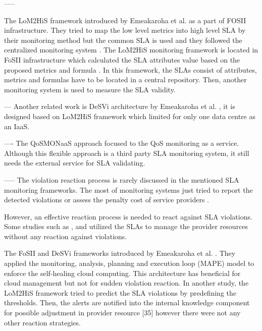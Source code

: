 -----


The LoM2HiS framework introduced by Emeakaroha et al. \cite{ [emeakaroha2010low] } as a part of FOSII \cite{fosii} infrastructure. They tried to map the low level metrics into high level SLA by their monitoring method but the common SLA is used and they followed the centralized monitoring system \cite{articleEmeakaroha2013}. The LoM2HiS monitoring framework is located in FoSII infrastructure which calculated the SLA attributes value based on the proposed metrics and formula \cite{articleEmeakaroha2013}. In this framework, the SLAs consist of attributes, metrics and formulas have to be located in a central repository.  Then, another monitoring system is used to measure the SLA validity. 

---
Another related work is DeSVi architecture by Emeakaroha et al. \cite{EMEAKAROHA20121017}, it is designed based on LoM2HiS \cite{5547150} framework which limited for only one data centre as an IaaS. 

----
The QoSMONaaS approach \cite{articleQoSMONaas} focused to the QoS monitoring as a service. Although this flexible approach is a third party SLA monitoring system, it still needs the external service for SLA validating.


-----
The violation reaction process is rarely discussed in the mentioned SLA monitoring frameworks.  The most of monitoring systems just tried to report the detected violations \cite{6225938} \cite{5175897} or assess the penalty cost of service providers \cite{10.1007/978-3-642-22709-7_46} \cite{Dastjerdi:2012:DOA:2275356.2275360}.

However, an effective reaction process is needed to react against SLA violations. Some studies such as \cite{6212007}, \cite{6150077} and \cite{WANG20121135} utilized the SLAs to manage the provider resources without any reaction against violations. 

The FoSII and DeSVi frameworks introduced by Emeakaroha et al. \cite{ [fosii] }\cite{EMEAKAROHA20121017}. They applied the monitoring, analysis, planning and execution loop
(MAPE) model to enforce the self-healing cloud computing. This architecture has beneficial for cloud management but not for sudden violation reaction. In another study, the LoM2HiS \cite{ [emeakaroha2010low] } framework tried to predict the SLA violations by predefining the thresholds. Then, the alerts are notified into the internal knowledge component for possible adjustment in provider resource [35] however there were not any other reaction strategies. 

